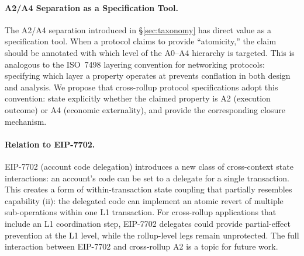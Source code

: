 \paragraph{A2/A4 Separation as a Specification Tool.}
The A2/A4 separation introduced in \S\ref{sec:taxonomy} has direct value as a
specification tool. When a protocol claims to provide ``atomicity,'' the claim
should be annotated with which level of the A0--A4 hierarchy is targeted. This
is analogous to the ISO~7498 layering convention for networking protocols:
specifying which layer a property operates at prevents conflation in both
design and analysis. We propose that cross-rollup protocol specifications
adopt this convention: state explicitly whether the claimed property is A2
(execution outcome) or A4 (economic externality), and provide the corresponding
closure mechanism.

\paragraph{Relation to EIP-7702.}
EIP-7702 (account code delegation) introduces a new class of cross-context
state interactions: an account's code can be set to a delegate for a single
transaction. This creates a form of within-transaction state coupling that
partially resembles capability (ii): the delegated code can implement an
atomic revert of multiple sub-operations within one L1 transaction. For
cross-rollup applications that include an L1 coordination step, EIP-7702
delegates could provide partial-effect prevention at the L1 level, while the
rollup-level legs remain unprotected. The full interaction between EIP-7702
and cross-rollup A2 is a topic for future work.
